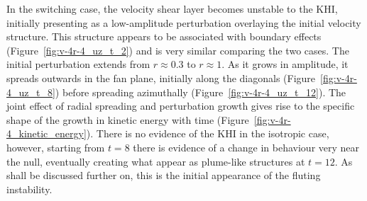 In the switching case, the velocity shear layer becomes unstable to the KHI, initially presenting as a low-amplitude perturbation overlaying the initial velocity structure. This structure appears to be associated with boundary effects (Figure~\ref{fig:v-4r-4_uz_t_2}) and is very similar comparing the two cases. The initial perturbation extends from $r\approx0.3$ to $r\approx1$. As it grows in amplitude, it spreads outwards in the fan plane, initially along the diagonals (Figure~\ref{fig:v-4r-4_uz_t_8}) before spreading azimuthally (Figure~\ref{fig:v-4r-4_uz_t_12}). The joint effect of radial spreading and perturbation growth gives rise to the specific shape of the growth in kinetic energy with time (Figure~\ref{fig:v-4r-4_kinetic_energy}). There is no evidence of the KHI in the isotropic case, however, starting from $t=8$ there is evidence of a change in behaviour very near the null, eventually creating what appear as plume-like structures at $t=12$. As shall be discussed further on, this is the initial appearance of the fluting instability.

